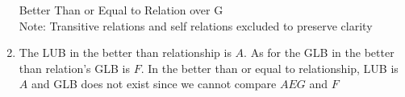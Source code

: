 \documentclass[12pt]{article}
\newenvironment{solution}[2][Solution]{ \begin{trivlist}
\item[\hskip \labelsep {\bfseries #1}]}{\end{trivlist}}
\begin{document}
\begin{solution}{7}
\begin{enumerate}[label=\alph*)]
\begin{minipage}[t]{\linewidth}
          \raggedright
          Better Than or Equal to Relation over G\\
           \footnotesize Note: Transitive relations and self relations excluded to preserve clarity
          \end{minipage}

\item The LUB in the better than relationship is $A$. As for the GLB in the better than relation's GLB is $F$. In the better than or equal to relationship, LUB is $A$ and GLB does not exist since we cannot compare $AEG$ and $F$


\end{enumerate}
\end{solution}
\end{document}

